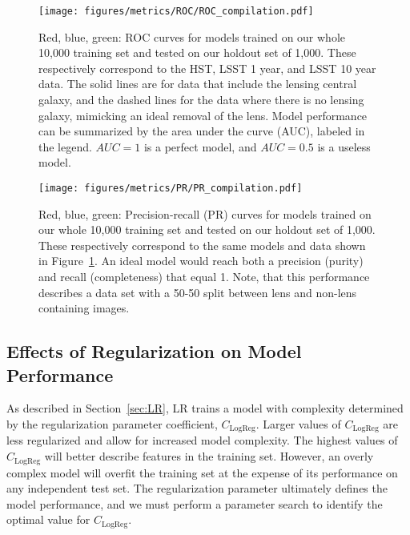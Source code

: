 \documentclass{emulateapj}
\begin{document}
\begin{figure}[t]
\begin{center}
\texttt{[image: figures/metrics/ROC/ROC\_compilation.pdf]}
\caption{Red, blue, green: ROC curves for models trained on our whole
  10,000 training set and tested on our holdout set of 1,000.  These
  respectively correspond to the HST, LSST 1 year, and LSST 10 year
  data.  The solid lines are for data that include the lensing central
  galaxy, and the dashed lines for the data where there is no lensing
  galaxy, mimicking an ideal removal of the lens.  Model performance
  can be summarized by the area under the curve (AUC), labeled in the
  legend. $AUC=1$ is a perfect model, and $AUC=0.5$ is a useless
  model.}\label{fig:ROCcompilation}
\end{center}
\end{figure}
\begin{figure}[t]
\begin{center}
\texttt{[image: figures/metrics/PR/PR\_compilation.pdf]}
\caption{Red, blue, green: Precision-recall (PR) curves for models
  trained on our whole 10,000 training set and tested on our holdout
  set of 1,000.  These respectively correspond to the same models and
  data shown in Figure~\ref{fig:ROCcompilation}.  An ideal model would
  reach both a precision (purity) and recall (completeness) that equal
  1.  Note, that this performance describes a data set with a 50-50
  split between lens and non-lens containing
  images.}\label{fig:PRcompilation}
\end{center}
\end{figure}

\subsection{Effects of Regularization on Model Performance}\label{sec:regularization}

As described in Section~\ref{sec:LR}, LR trains a model with
complexity determined by the regularization parameter coefficient,
$C_\text{LogReg}$.  Larger values of $C_\text{LogReg}$ are less
regularized and allow for increased model complexity.  The highest
values of $C_\text{LogReg}$ will better describe features in the
training set.  However, an overly complex model will overfit the
training set at the expense of its performance on any independent test
set.  The regularization parameter ultimately defines the model
performance, and we must perform a parameter search to identify the
optimal value for $C_\text{LogReg}$.
\end{document}
